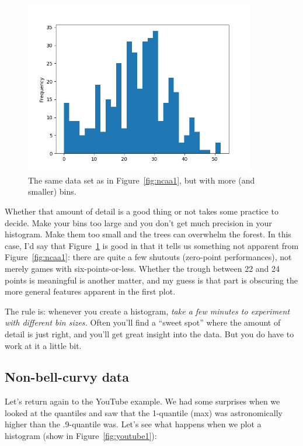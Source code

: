 \begin{figure}[ht]
\centering
\includegraphics[width=0.9\textwidth]{ncaa2.png}
\caption{The same data set as in Figure~\ref{fig:ncaa1}, but with more (and
smaller) bins.}
\label{fig:ncaa2}
\end{figure}

Whether that amount of detail is a good thing or not takes some practice to
decide. Make your bins too large and you don't get much precision in your
histogram. Make them too small and the trees can overwhelm the forest. In this
case, I'd say that Figure~\ref{fig:ncaa2} is good in that it tells us something
not apparent from Figure~\ref{fig:ncaa1}: there are quite a few shutouts
(zero-point performances), not merely games with six-points-or-less. Whether
the trough between 22 and 24 points is meaningful is another matter, and my
guess is that part is obscuring the more general features apparent in the first
plot.


The rule is: whenever you create a histogram, \textit{take a few minutes to
experiment with different bin sizes.} Often you'll find a ``sweet spot'' where
the amount of detail is just right, and you'll get great insight into the data.
But you do have to work at it a little bit.

\subsection{Non-bell-curvy data}


Let's return again to the YouTube example. We had some surprises when we looked
at the quantiles and saw that the 1-quantile (max) was astronomically higher
than the .9-quantile was. Let's see what happens when we plot a histogram
(show in Figure~\ref{fig:youtube1}):

